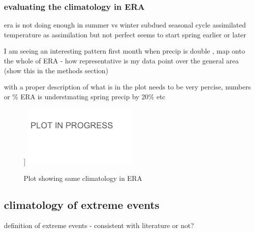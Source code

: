 \documentclass[draft]{agujournal2019}
\begin{document}
\subsubsection{evaluating the climatology in ERA}
era is not doing enough in summer vs winter 
subdued seasonal cycle 
assimilated temperature as assimilation but not perfect
seems to start spring earlier or later 



I am seeing an interesting pattern 
first month when precip is double , map onto the whole of ERA - how representative is my data point over the general area (show this in the methods section)

with a proper description of what is in the plot
needs to be very percise, numbers or \%
ERA is understmating spring precip by 20\% etc


\begin{figure}[h!tbp]]
\noindent\includegraphics[width=0.5\textwidth]{figures/plot_in_progress.png}
\caption{Plot showing same climatology in ERA}
\end{figure}



\subsection{climatology of extreme events}
definition of extreme events - consistent with literature or not?
\end{document}
